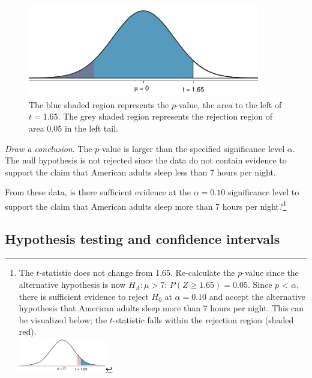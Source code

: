 \begin{spacing}{1.5}
\begin{example}
\begin{figure}[h]
	\centering
	\includegraphics[width=0.9\textwidth]{ch_inference_foundations_oi_biostat/figures/pValueSleep/pValueSleep}
	\caption{The blue shaded region represents the $p$-value, the area to the left of $t = 1.65$. The grey shaded region represents the rejection region of area 0.05 in the left tail.}
	\label{pValueSleep}
\end{figure}

\textit{Draw a conclusion}.  The $p$-value is larger than the specified significance level $\alpha$. The null hypothesis is not rejected since the data do not contain evidence to support the claim that American adults sleep less than 7 hours per night.

\end{example}

\begin{exercise}
	From these data, is there sufficient evidence at the $\alpha = 0.10$ significance level to support the claim that American adults sleep more than 7 hours per night?\footnote{The $t$-statistic does not change from 1.65. Re-calculate the $p$-value since the alternative hypothesis is now $H_A: \mu > 7$: $P(Z \geq 1.65) = 0.05$. Since $p$ < $\alpha$, there is sufficient evidence to reject $H_0$ at $\alpha = 0.10$ and accept the alternative hypothesis that American adults sleep more than 7 hours per night. This can be visualized below; the $t$-statistic falls within the rejection region (shaded red).\\
	\includegraphics[width=0.3\textwidth]{ch_inference_foundations_oi_biostat/figures/pValueSleep/pValueSleepEx}}
\end{exercise}

\subsection{Hypothesis testing and confidence intervals}


\end{spacing}
